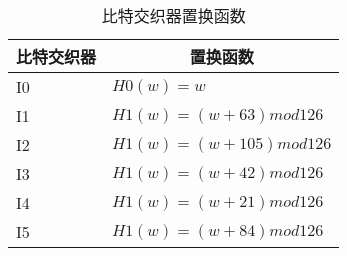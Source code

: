\begin{table}[!h]
	\centering
	\caption{比特交织器置换函数}
	\begin{tabular}{|l|l|}
	\hline
	\multicolumn{1}{|c|}{比特交织器} & \multicolumn{1}{|c|}{置换函数} \\
	\hline
	I0 & $H0(w)=w$ \\
	\hline
	I1 & $H1(w)=(w+63) mod 126$ \\
	\hline
	I2 & $H1(w)=(w+105) mod 126$ \\
	\hline
	I3 & $H1(w)=(w+42) mod 126$ \\
	\hline
	I4 & $H1(w)=(w+21) mod 126$ \\
	\hline
	I5 & $H1(w)=(w+84) mod 126$ \\
	\hline
	\end{tabular}
	\label{table:inner_interleaver_hew}
\end{table}

\endinput